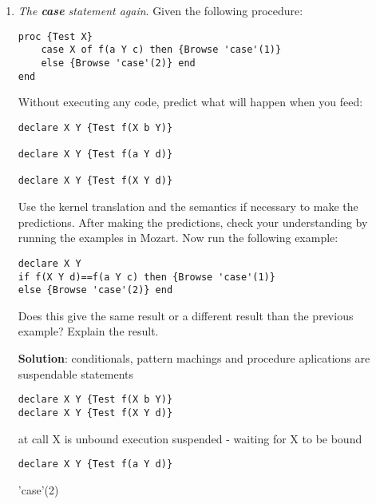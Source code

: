 \documentclass[11pt]{article}
\begin{document}
\begin{enumerate}
Without executing any code, predict what will happen when you feed
\begin{verbatim}
{Test [b c a]}, {Test f(b(3))}, {Test f(a)}, {Test f(a(3))}, 
{Test f(d)}, {Test [a b c]}, {Test [c a b]}, {Test a|a}, 
and {Test '|'(a b c)}.
\end{verbatim}

\newpage
{\bfseries Solution}:
\begin{alltt}
{Test [b c a]} \(\to\) case(4)
{Test f(b(3))} \(\to\) case(5) 
{Test f(a)}    \(\to\) case(2)
{Test f(a(3))} \(\to\) case(5) 
{Test f(d)}    \(\to\) case(5) 
{Test [a b c]} \(\to\) case(1)
{Test [c a b]} \(\to\) case(4) 
{Test a|a},    \(\to\) case(1) 
{Test'|'(a b c)} \(\to\) case(6)
\end{alltt}

\item {\itshape The {\bfseries case} statement again}. Given the following procedure:
\begin{verbatim}
proc {Test X}
    case X of f(a Y c) then {Browse 'case'(1)}
    else {Browse 'case'(2)} end
end
\end{verbatim}
Without executing any code, predict what will happen when you feed:
\begin{verbatim}
declare X Y {Test f(X b Y)}

declare X Y {Test f(a Y d)}

declare X Y {Test f(X Y d)}
\end{verbatim}
Use the kernel translation and the semantics if necessary to make the predictions.
After making the predictions, check your understanding by running the examples
in Mozart. Now run the following example:
\begin{verbatim}
declare X Y
if f(X Y d)==f(a Y c) then {Browse 'case'(1)}
else {Browse 'case'(2)} end
\end{verbatim}
Does this give the same result or a different result than the previous example?
Explain the result.

{\bfseries Solution}: conditionals, pattern machings and procedure aplications are suspendable statements

\begin{verbatim}
declare X Y {Test f(X b Y)}
declare X Y {Test f(X Y d)}
\end{verbatim}
at call X is unbound execution suspended - waiting for X to be bound
\\
\begin{verbatim}
declare X Y {Test f(a Y d)}
\end{verbatim}
'case'(2)


\end{enumerate}
\end{document}
